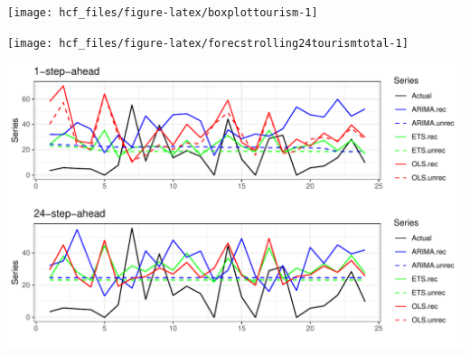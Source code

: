 \documentclass[11pt,a4paper,]{article}
\let\origfigure\figure
\let\endorigfigure\endfigure
\renewenvironment{figure}[1][2] {
    \expandafter\origfigure\expandafter[!htbp]
} {
    \endorigfigure
}
\begin{document}
\begin{figure}

{\centering \texttt{[image: hcf\_files/figure-latex/boxplottourism-1]} 

}

\caption{Box plots of forecast errors for reconciled and unreconciled ETS, ARIMA and OLS methods at each hierarchical level for fixed origin 24-step-ahead tourism demand.}\label{fig:boxplottourism}
\end{figure}

\begin{figure}

{\centering \texttt{[image: hcf\_files/figure-latex/forecstrolling24tourismtotal-1]} 

}

\caption{The actual test set for the 'Total series' compared to the forecasts from reconciled and unreconciled ETS, ARIMA and OLS methods for rolling and fixed origin 24-step-ahead tourism demand.}\label{fig:forecstrolling24tourismtotal}
\end{figure}

\begin{figure}

{\centering \includegraphics[width=1\linewidth]{hcf_files/figure-latex/forecstrolling24tourism-1} 

}

\caption{The actual test set for the 'BACBus' bottom level series compared to the forecasts from reconciled and unreconciled ETS, ARIMA and OLS methods for rolling and fixed origin 24-step-ahead tourism demand.}\label{fig:forecstrolling24tourism}
\end{figure}

\newpage
\end{document}
